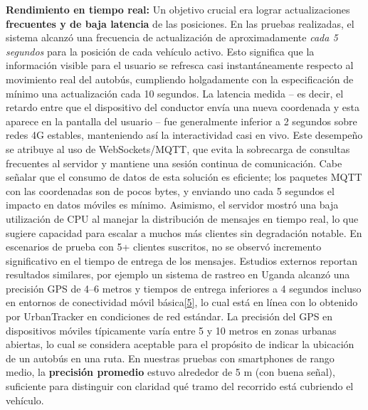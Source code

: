 \textbf{Rendimiento en tiempo real:} Un objetivo crucial era lograr actualizaciones \textbf{frecuentes y de baja latencia} de las posiciones. En las pruebas realizadas, el sistema alcanzó una frecuencia de actualización de aproximadamente \emph{cada 5 segundos} para la posición de cada vehículo activo. Esto significa que la información visible para el usuario se refresca casi instantáneamente respecto al movimiento real del autobús, cumpliendo holgadamente con la especificación de mínimo una actualización cada 10 segundos. La latencia medida -- es decir, el retardo entre que el dispositivo del conductor envía una nueva coordenada y esta aparece en la pantalla del usuario -- fue generalmente inferior a 2 segundos sobre redes 4G estables, manteniendo así la interactividad casi en vivo. Este desempeño se atribuye al uso de WebSockets/MQTT, que evita la sobrecarga de consultas frecuentes al servidor y mantiene una sesión continua de comunicación. Cabe señalar que el consumo de datos de esta solución es eficiente; los paquetes MQTT con las coordenadas son de pocos bytes, y enviando uno cada 5 segundos el impacto en datos móviles es mínimo. Asimismo, el servidor mostró una baja utilización de CPU al manejar la distribución de mensajes en tiempo real, lo que sugiere capacidad para escalar a muchos más clientes sin degradación notable. En escenarios de prueba con 5+ clientes suscritos, no se observó incremento significativo en el tiempo de entrega de los mensajes. Estudios externos reportan resultados similares, por ejemplo un sistema de rastreo en Uganda alcanzó una precisión GPS de 4--6 metros y tiempos de entrega inferiores a 4 segundos incluso en entornos de conectividad móvil básica\href{https://fliphtml5.com/lqsof/cdpg/Art\%C3\%ADculos/\#:~:text=sistema,a\%206\%20metros\%2C\%20una\%20latencia}{{[}5{]}}, lo cual está en línea con lo obtenido por UrbanTracker en condiciones de red estándar. La precisión del GPS en dispositivos móviles típicamente varía entre 5 y 10 metros en zonas urbanas abiertas, lo cual se considera aceptable para el propósito de indicar la ubicación de un autobús en una ruta. En nuestras pruebas con smartphones de rango medio, la \textbf{precisión promedio} estuvo alrededor de 5 m (con buena señal), suficiente para distinguir con claridad qué tramo del recorrido está cubriendo el vehículo.

